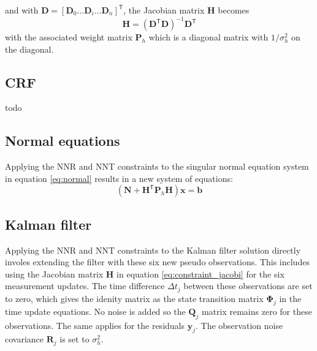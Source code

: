 \documentclass[twoside=true,fontsize=12pt,paper=a4,titlepage=on]{kv_article}
\begin{document}
\noindent and with $\bm{D} = {\left[\bm{D}_0 \ldots \bm{D}_i \ldots \bm{D}_n \right]}^{\mathsf{T}}$, the Jacobian matrix
$\bm{H}$ becomes
\begin{equation}
\bm{H} = (\bm{D}^\mathsf{T}\bm{D})^{-1}\bm{D}^{\mathsf{T}}
\label{eq:constraint_jacobi}
\end{equation}
with the associated weight matrix $\bm{P}_h$ which is a diagonal matrix with $1/\sigma_h^2$ on the diagonal. 
\subsection{CRF}
todo

\subsection{Normal equations}
Applying the NNR and NNT constraints to the singular normal equation system in equation \ref{eq:normal} results in a new
system of equations:
\begin{equation}
\left(\bm{N} + \bm{H}^\mathsf{T}\bm{P}_h\bm{H}\right)\bm{x} = \bm{b}
\end{equation}

\subsection{Kalman filter}
Applying the NNR and NNT constraints to the Kalman filter solution directly involes extending the filter with these six
new pseudo observations. This includes using the Jacobian matrix $\bm{H}$ in equation \ref{eq:constraint_jacobi} for the six
measurement updates. The time difference $\Delta t_j$ between these observations are set to zero, which gives the 
idenity matrix as the state transition matrix $\bm{\Phi}_j$ in the time update equations. No noise is added so the $\bm{Q}_j$ matrix remains 
zero for these observations. The same applies for the residuals $\bm{y}_j$. The observation noise covariance $\bm{R}_j$ is set to 
$\sigma_h^2$.


\newpage


\end{document}
